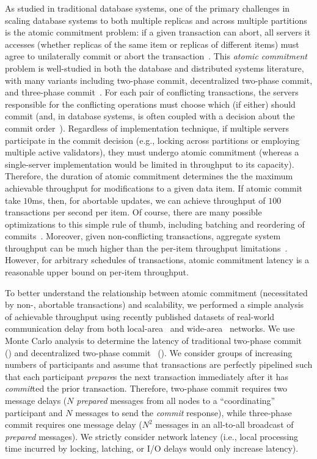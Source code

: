 As studied in traditional database systems, one of the primary
challenges in scaling database systems to both multiple replicas and
across multiple partitions is the atomic commitment problem: if a
given transaction can abort, all servers it accesses (whether replicas
of the same item or replicas of different items) must agree to
unilaterally commit or abort the
transaction~\cite{bernstein-book}. This \textit{atomic commitment}
problem is well-studied in both the database and distributed systems
literature, with many variants including two-phase commit,
decentralized two-phase commit, and three-phase
commit~\cite{atomictransactions,paxos-commit,traiger-tods}. For each
pair of conflicting transactions, the servers responsible for the
conflicting operations must choose which (if either) should commit
(and, in database systems, is often coupled with a decision about the
commit order~\cite{hat-vldb,calvin,traiger-tods}). Regardless of
implementation technique, if multiple servers participate in the
commit decision (e.g., locking across partitions or employing multiple
active validators), they must undergo atomic commitment (whereas a
single-server implementation would be limited in throughput to its
capacity). Therefore, the duration of atomic commitment determines the
the maximum achievable throughput for modifications to a given data
item. If atomic commit take $10$ms, then, for abortable updates, we
can achieve throughput of $100$ transactions per second per item. Of
course, there are many possible optimizations to this simple rule of
thumb, including batching and reordering of
commits~\cite{calvin}. Moreover, given non-conflicting transactions,
aggregate system throughput can be much higher than the per-item
throughput limitations~\cite{spanner, f1}. However, for arbitrary
schedules of transactions, atomic commitment latency is a reasonable
upper bound on per-item throughput.

To better understand the relationship between atomic commitment
(necessitated by non-\iconfluent, abortable transactions) and
scalability, we performed a simple analysis of achievable throughput
using recently published datasets of real-world communication delay
from both local-area~\cite{bobtail} and wide-area~\cite{hat-vldb}
networks. We use Monte Carlo analysis to determine the latency of
traditional two-phase commit~\cite{bernstein-book} (\dpc) and
decentralized two-phase commit~\cite{paxos-commit} (\cpc). We consider
groups of increasing numbers of participants and assume that
transactions are perfectly pipelined such that each participant
\textit{prepare}s the next transaction immediately after it has
\textit{commit}ted the prior transaction. Therefore, two-phase commit
requires two message delays ($N$ \textit{prepared} messages from all
nodes to a ``coordinating'' participant and $N$ messages to send the
\textit{commit} response), while three-phase commit requires one
message delay ($N^2$ messages in an all-to-all broadcast of
\textit{prepared} messages). We strictly consider network latency
(i.e., local processing time incurred by locking, latching, or I/O
delays would only increase latency).

